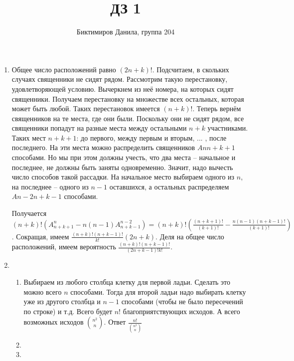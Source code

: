 \documentclass[11pt]{article}
\begin{document}
	
	\author{Биктимиров Данила, группа 204}
	\title{ДЗ 1}
	\date{}
	\maketitle
	
	\medskip
	
	\begin{enumerate}
		
		\item Общее число расположений равно $(2n+k)!$. Подсчитаем, в скольких случаях священники не сидят рядом. Рассмотрим такую перестановку, удовлетворяющей условию. Вычеркнем из неё номера, на которых сидят священники. Получаем перестановку на множестве всех остальных, которая может быть любой. Таких перестановок имеется $(n+k)!$. Теперь вернём священников на те места, где они были. Поскольку они не сидят рядом, все священники попадут на разные места между остальными $n+k$ участниками. Таких мест $n+k+1$: до первого, между первым и вторым, $...$ , после последнего. На эти места можно распределить священников $Ann+k+1$ способами. Но мы при этом должны учесть, что два места -- начальное и последнее, не должны быть заняты одновременно. Значит, надо вычесть число способов такой рассадки. На начальное место выбираем одного из $n$, на последнее -- одного из $n−1$ оставшихся, а остальных распределяем $An−2n+k−1$ способами.
		
		Получается $(n+k)!(A^n_{n+k+1}−n(n−1)A^{n−2}_{n+k−1})=(n+k)!(\frac{(n+k+1)!}{(k+1)!}−\frac{n(n−1)(n+k−1)!}{(k+1)!})$. Сокращая, имеем $\frac{(n+k)!(n+k−1)!}{k!}(2n+k)$. Деля на общее число расположений, имеем вероятность $\frac{(n+k)!(n+k−1)!}{(2n+k−1)!k!}$.
		\item
		\begin{enumerate}
			\item Выбираем из любого столбца клетку для первой ладьи. Сделать это можно всего $n$ способами. Тогда для второй ладьи надо выбирать клетку уже из другого столбца и $n-1$ способами (чтобы не было пересечений по строке) и т.д. Всего будет $n!$ благоприятствующих исходов. А всего возможных исходов ${n^2 \choose n}$. Ответ $\frac{n!}{{n^2 \choose n}}$
			\item
			\item
		\end{enumerate}
		
	\end{enumerate}
\end{document}
